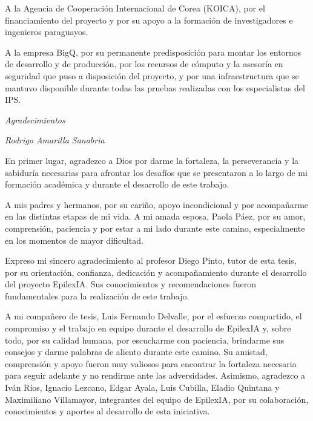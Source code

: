 {A la Agencia de Cooperación Internacional de Corea (KOICA), por el financiamiento del proyecto y por su apoyo a la formación de investigadores e ingenieros paraguayos.

A la empresa BigQ, por su permanente predisposición para montar los entornos de desarrollo y de producción, por los recursos de cómputo y la asesoría en seguridad que puso a disposición del proyecto, y por una infraestructura que se mantuvo disponible durante todas las pruebas realizadas con los especialistas del IPS.

}

\clearpage



\begingroup

\thispagestyle{empty}

\begin{center}
    {\huge\textit{Agradecimientos}\par}
\end{center}

\vspace{1em}

\begin{flushright}
\textit{Rodrigo Amarilla Sanabria}
\end{flushright}


En primer lugar, agradezco a Dios por darme la fortaleza,
la perseverancia y la sabiduría necesarias para afrontar
los desafíos que se presentaron a lo largo de mi formación
académica y durante el desarrollo de este trabajo.

A mis padres y hermanos, por su cariño, apoyo incondicional
y por acompañarme en las distintas etapas de mi vida.
A mi amada esposa, Paola Páez, por su amor, comprensión, paciencia
y por estar a mi lado durante este camino, especialmente
en los momentos de mayor dificultad.

Expreso mi sincero agradecimiento al profesor Diego Pinto,
tutor de esta tesis, por su orientación, confianza,
dedicación y acompañamiento durante el desarrollo del
proyecto EpilexIA. Sus conocimientos y recomendaciones
fueron fundamentales para la realización de este trabajo.


A mi compañero de tesis, Luis Fernando Delvalle,
por el esfuerzo compartido, el compromiso y el
trabajo en equipo durante el desarrollo de EpilexIA y,
sobre todo, por su calidad humana, por
escucharme con paciencia, brindarme sus consejos
y darme palabras de aliento durante este camino.
Su amistad, comprensión y apoyo fueron muy
valiosos para encontrar la fortaleza necesaria
para seguir adelante y no rendirme ante las
adversidades. Asimismo,
agradezco a Iván Ríos, Ignacio Lezcano, Edgar Ayala,
Luis Cubilla, Eladio Quintana y Maximiliano Villamayor,
integrantes del equipo de EpilexIA, por su colaboración,
conocimientos y aportes al desarrollo de esta iniciativa.

